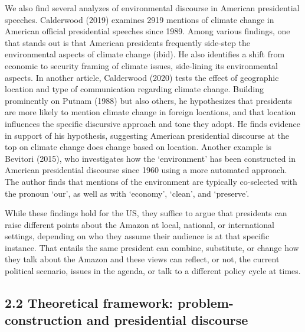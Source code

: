 \documentclass[
]{article}
\begin{document}
We also find several analyzes of environmental discourse in American
presidential speeches. Calderwood (2019) examines 2919 mentions of
climate change in American official presidential speeches since 1989.
Among various findings, one that stands out is that American presidents
frequently side-step the environmental aspects of climate change (ibid).
He also identifies a shift from economic to security framing of climate
issues, side-lining its environmental aspects. In another article,
Calderwood (2020) tests the effect of geographic location and type of
communication regarding climate change. Building prominently on Putnam
(1988) but also others, he hypothesizes that presidents are more likely
to mention climate change in foreign locations, and that location
influences the specific discursive approach and tone they adopt. He
finds evidence in support of his hypothesis, suggesting American
presidential discourse at the top on climate change does change based on
location. Another example is Bevitori (2015), who investigates how the
`environment' has been constructed in American presidential discourse
since 1960 using a more automated approach. The author finds that
mentions of the environment are typically co-selected with the pronoun
`our', as well as with `economy', `clean', and `preserve'.

While these findings hold for the US, they suffice to argue that
presidents can raise different points about the Amazon at local,
national, or international settings, depending on who they assume their
audience is at that specific instance. That entails the same president
can combine, substitute, or change how they talk about the Amazon and
these views can reflect, or not, the current political scenario, issues
in the agenda, or talk to a different policy cycle at times.

\hypertarget{theoretical-framework-problem-construction-and-presidential-discourse}{%
\subsection{2.2 Theoretical framework: problem-construction and
presidential
discourse}\label{theoretical-framework-problem-construction-and-presidential-discourse}}
\end{document}
